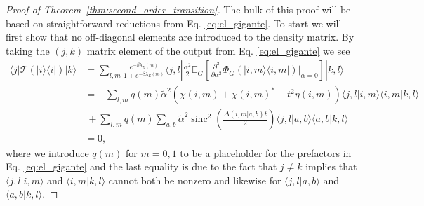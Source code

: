 \documentclass[
 amsmath,amssymb,
 aps,
onecolumn, 
nofootinbib]{revtex4-2}
\newcommand{\ket}[1]{|#1\rangle}
\newcommand{\bra}[1]{\langle #1|}
\newcommand{\braket}[2]{\langle #1|#2\rangle}
\newcommand{\ketbra}[2]{| #1\rangle\! \langle #2|}
\DeclareMathOperator{\sinc}{sinc}
\begin{document}
\begin{proof}[Proof of Theorem~\ref{thm:second_order_transition}]
    The bulk of this proof will be based on straightforward reductions from Eq. \eqref{eq:el_gigante}. To start we will first show that no off-diagonal elements are introduced to the density matrix. By taking the $(j,k)$ matrix element of the output from Eq. \eqref{eq:el_gigante} we see
    \begin{align}
        \bra{j} \mathcal{T}(\ketbra{i}{i})\ket{k} &= \sum_{l, m} \frac{e^{-\beta \lambda_E(m)}}{1 + e^{-\beta \lambda_E(m)}} \bra{j, l} \frac{\alpha^2}{2} \mathbb{E}_{G} \left[ \frac{\partial^2}{\partial \alpha^2} \Phi_G(\ketbra{i, m}{i, m}) \big|_{\alpha = 0} \right] \ket{k, l} \\
        &= - \sum_{l,m} q(m) \widetilde{\alpha}^2 (\chi(i,m) + \chi(i,m)^* + t^2 \eta(i,m)) \braket{j, l}{i, m} \braket{i, m}{k, l} \nonumber \\
        &~ + \sum_{l, m} q(m) \sum_{a,b} \widetilde{\alpha}^2 \sinc^2 \left(\frac{\Delta(i,m|a,b)t }{2} \right) \braket{j, l}{a,b} \braket{a, b}{k, l} \\
        &= 0,
    \end{align}
    where we introduce $q(m)$ for $m=0,1$ to be a placeholder for the prefactors in Eq. \eqref{eq:el_gigante} and the last equality is due to the fact that $j \neq k$ implies that $\braket{j, l}{i,m}$ and $\braket{i,m}{k, l}$ cannot both be nonzero and likewise for $\braket{j, l}{a,b}$ and $\braket{a,b}{k,l}$.
    

\end{proof}
\end{document}
